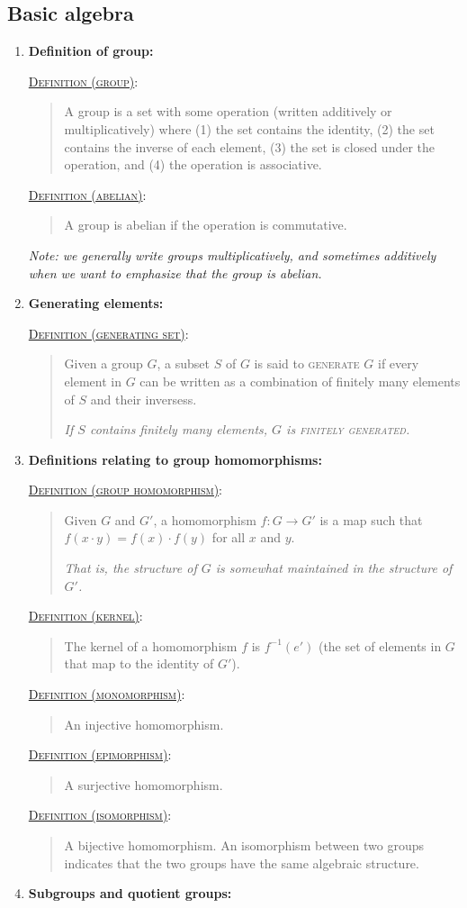 \documentclass[letterpaper, 12pt]{article}
\newcommand{\defn}[2]{\textsc{\underline{Definition (#1)}:}\begin{quote} #2\end{quote}}
\begin{document}
    \subsection{Basic algebra}
        \begin{enumerate}[resume]
        \item \textbf{Definition of group:}

            \defn{group}{A group is a set with some operation (written additively or multiplicatively) where (1) the set contains the identity, (2) the set contains the inverse of each element, (3) the set is closed under the operation, and (4) the operation is associative.}

            \defn{abelian}{A group is abelian if the operation is commutative.}

            \textit{Note: we generally write groups multiplicatively, and sometimes additively when we want to emphasize that the group is abelian.}
        \item \textbf{Generating elements:}

            \defn{generating set}{Given a group $G$, a subset $S$ of $G$ is said to \textsc{generate} $G$ if every element in $G$ can be written as a combination of finitely many elements of $S$ and their inversess.

            \textit{If $S$ contains finitely many elements, $G$ is \textsc{finitely generated}.}}
        \item \textbf{Definitions relating to group homomorphisms:}

            \defn{group homomorphism}{Given $G$ and $G'$, a homomorphism $f : G\to G'$ is a map such that $f(x\cdot y) = f(x)\cdot f(y)$ for all $x$ and $y$.

            \textit{That is, the structure of $G$ is somewhat maintained in the structure of $G'$.}}

            \defn{kernel}{The kernel of a homomorphism $f$ is $f^{-1}(e')$ (the set of elements in $G$ that map to the identity of $G'$).}

            \defn{monomorphism}{An injective homomorphism.}

            \defn{epimorphism}{A surjective homomorphism.}

            \defn{isomorphism}{A bijective homomorphism. An isomorphism between two groups indicates that the two groups have the same algebraic structure.}
        \item \textbf{Subgroups and quotient groups:}


\end{enumerate}
\end{document}
